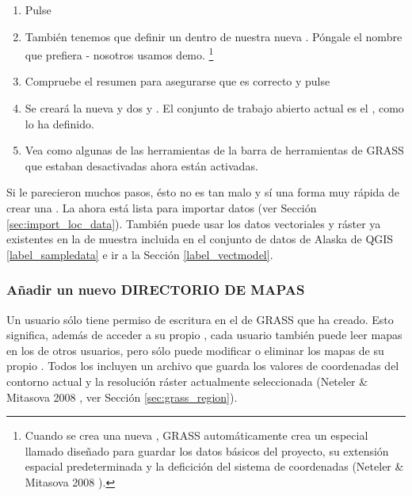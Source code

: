\begin{enumerate}
  \item Pulse  
  \item También tenemos que definir un  dentro de nuestra nueva 
  . Póngale el nombre que prefiera - nosotros usamos demo.
  \footnote{Cuando se crea una nueva , GRASS automáticamente 
  crea un  especial llamado  diseñado para 
  guardar los datos básicos del proyecto, su extensión espacial predeterminada y 
  la deficición del sistema de coordenadas (Neteler \& Mitasova 2008 
  \cite{neteler_mitasova08}).}
  \item Compruebe el resumen para asegurarse que es correcto y pulse
  \item Se creará la nueva  y dos 
  y . El conjunto de trabajo abierto actual es el
  , como lo ha definido.
  \item Vea como algunas de las herramientas de la barra de herramientas de GRASS que estaban desactivadas ahora están activadas.
\end{enumerate}

Si le parecieron muchos pasos, ésto no es tan malo y sí una forma muy rápida de crear una . La  ahora está lista para importar datos (ver Sección \ref{sec:import_loc_data}).
También puede usar los datos vectoriales y ráster ya existentes en la  de muestra incluida en el conjunto de datos de Alaska de QGIS 
\ref{label_sampledata} e ir a la Sección \ref{label_vectmodel}.

\subsubsection{Añadir un nuevo DIRECTORIO DE MAPAS}\label{sec:add_mapset}

Un usuario sólo tiene permiso de escritura en el  de GRASS que ha creado. Esto 
significa, además de acceder a su propio , cada usuario también puede leer mapas en los 
 de otros usuarios, pero sólo puede modificar o eliminar los mapas de su propio 
. Todos los  incluyen un archivo 
 que guarda los valores de coordenadas del contorno actual y 
la resolución ráster actualmente seleccionada (Neteler \& Mitasova 2008 
\cite{neteler_mitasova08}, ver Sección \ref{sec:grass_region}). 

